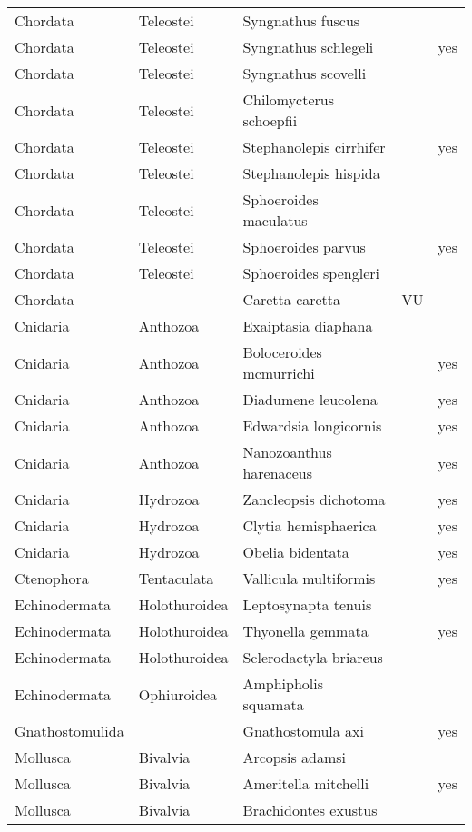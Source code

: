\begin{longtable}{lllll}
  Chordata & Teleostei & Syngnathus fuscus &  &  \\ 
  Chordata & Teleostei & Syngnathus schlegeli &  & yes \\ 
  Chordata & Teleostei & Syngnathus scovelli &  &  \\ 
  Chordata & Teleostei & Chilomycterus schoepfii &  &  \\ 
  Chordata & Teleostei & Stephanolepis cirrhifer &  & yes \\ 
  Chordata & Teleostei & Stephanolepis hispida &  &  \\ 
  Chordata & Teleostei & Sphoeroides maculatus &  &  \\ 
  Chordata & Teleostei & Sphoeroides parvus &  & yes \\ 
  Chordata & Teleostei & Sphoeroides spengleri &  &  \\ 
  Chordata &  & Caretta caretta & VU &  \\ 
  Cnidaria & Anthozoa & Exaiptasia diaphana &  &  \\ 
  Cnidaria & Anthozoa & Boloceroides mcmurrichi &  & yes \\ 
  Cnidaria & Anthozoa & Diadumene leucolena &  & yes \\ 
  Cnidaria & Anthozoa & Edwardsia longicornis &  & yes \\ 
  Cnidaria & Anthozoa & Nanozoanthus harenaceus &  & yes \\ 
  Cnidaria & Hydrozoa & Zancleopsis dichotoma &  & yes \\ 
  Cnidaria & Hydrozoa & Clytia hemisphaerica &  & yes \\ 
  Cnidaria & Hydrozoa & Obelia bidentata &  & yes \\ 
  Ctenophora & Tentaculata & Vallicula multiformis &  & yes \\ 
  Echinodermata & Holothuroidea & Leptosynapta tenuis &  &  \\ 
  Echinodermata & Holothuroidea & Thyonella gemmata &  & yes \\ 
  Echinodermata & Holothuroidea & Sclerodactyla briareus &  &  \\ 
  Echinodermata & Ophiuroidea & Amphipholis squamata &  &  \\ 
  Gnathostomulida &  & Gnathostomula axi &  & yes \\ 
  Mollusca & Bivalvia & Arcopsis adamsi &  &  \\ 
  Mollusca & Bivalvia & Ameritella mitchelli &  & yes \\ 
  Mollusca & Bivalvia & Brachidontes exustus &  &  \\ 

\end{longtable}
